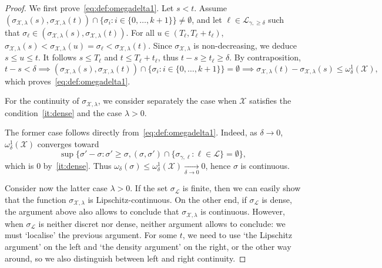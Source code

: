 \documentclass[11pt]{article}
\begin{document}
\begin{proof}

  We first prove~\eqref{eq:def:omegadelta1}.
  Let $s<t$. Assume $(\sigma_{\mathcal{X},\lambda}(s),\sigma_{\mathcal{X},\lambda}(t))\cap \{ \sigma_i : i\in \{0,\dots, k+1\} \}\neq \emptyset$, and let $\ell \in \mathcal{L}_{\gamma,\geq \delta}  $ such that $\sigma_\ell \in (\sigma_{\mathcal{X},\lambda}(s),\sigma_{\mathcal{X},\lambda}(t))$. For all $u\in (T_\ell,T_\ell+t_\ell)$, $\sigma_{\mathcal{X},\lambda}(s)< \sigma_{\mathcal{X},\lambda}(u)=\sigma_{\ell}< \sigma_{\mathcal{X},\lambda}(t)$. Since $\sigma_{\mathcal{X},\lambda}$ is non-decreasing, we deduce $s\leq u\leq t$.
  It follows $s\leq T_\ell$ and $t\leq T_\ell+t_\ell$, thus $t-s\geq t_\ell\geq \delta$. By contraposition,
  \[ t-s<\delta\implies
  (\sigma_{\mathcal{X},\lambda}(s),\sigma_{\mathcal{X},\lambda}(t))\cap \{ \sigma_i : i\in \{0,\dots, k+1\}\}
   = \emptyset \implies \sigma_{\mathcal{X},\lambda}(t)-\sigma_{\mathcal{X},\lambda}(s) \leq \omega^1_{\delta}(\mathcal{X}),\]
  which proves~\eqref{eq:def:omegadelta1}.

  For the continuity of $\sigma_{\mathcal{X},\lambda}$, we consider separately the case when $\mathcal{X}$ satisfies the condition~\eqref{it:dense} and the case $\lambda>0$.

  The former case follows directly from~\eqref{eq:def:omegadelta1}. Indeed, as $\delta\to 0$, $\omega^1_{\delta}(\mathcal{X})$ converges toward \[ \sup \{ \sigma'-\sigma :\sigma'\geq \sigma, (\sigma,\sigma')\cap \{ \sigma_{\gamma,\ell}: \ell \in \mathcal{L} \}  =\emptyset \},\]
  which is $0$ by~\eqref{it:dense}. Thus $\omega_\delta(\sigma)\leq \omega^1_{\delta}(\mathcal{X}) \underset{\delta\to 0}\longrightarrow 0$, hence $\sigma$ is continuous.

  Consider now the latter case $\lambda >0$. If the set $\sigma_\mathcal{L}$ is finite, then we can easily show that the function $\sigma_{\mathcal{X},\lambda}$ is Lipschitz-continuous. On the other end, if $\sigma_\mathcal{L}$ is dense, the argument above also allows to conclude that $\sigma_{\mathcal{X},\lambda}$ is continuous. However, when $\sigma_\mathcal{L}$ is neither discret nor dense, neither argument allows to conclude: we must `localise' the previous argument. For some $t$,  we need to use `the Lipschitz argument' on the left and `the density argument' on the right, or the other way around, so we also distinguish between left and right continuity. %


\end{proof}
\end{document}
